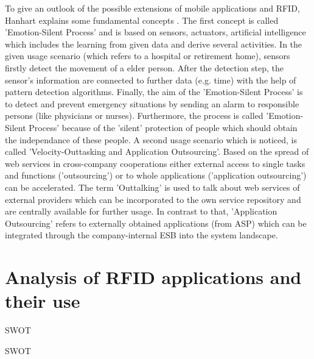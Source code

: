 To give an outlook of the possible extensions of mobile applications and RFID, Hanhart explains some fundamental concepts \cite[p.208 ff.]{mobile}. The first concept is called 'Emotion-Silent Process' and is based on sensors, actuators, artificial intelligence which includes the learning from given data and derive several activities. In the given usage scenario (which refers to a hospital or retirement home), sensors firstly detect the movement of a elder person. After the detection step, the sensor's information are connected to further data (e.g. time) with the help of pattern detection algorithms. Finally, the aim of the 'Emotion-Silent Process' is to detect and prevent emergency situations by sending an alarm to responsible persons (like physicians or nurses). Furthermore, the process is called 'Emotion-Silent Process' because of the 'silent' protection of people which should obtain the independance of these people.
A second usage scenario which is noticed, is called 'Velocity-Outtasking and Application Outsourcing'. Based on the spread of web services in cross-company cooperations either external access to single tasks and functions ('outsourcing') or to whole applications ('application outsourcing') can be accelerated. 
The term 'Outtalking' is used to talk about web services of external providers which can be incorporated to the own service repository and are centrally available for further usage. In contrast to that, 'Application Outsourcing' refers to externally obtained applications (from \ac{ASP}) which can be integrated through the company-internal ESB into the system landscape.

\section{Analysis of RFID applications and their use}

SWOT \cite[p.47 ff.]{fokus}

\ac{SWOT}

















